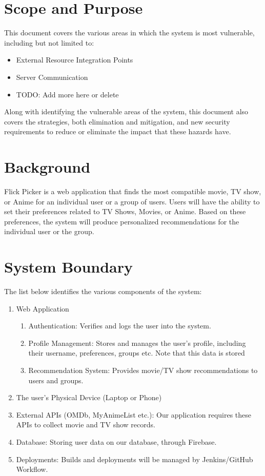 \documentclass[12pt]{article}
\begin{document}
\section{Scope and Purpose}
This document covers the various areas in which the system is most vulnerable, including but not limited to:
\begin{itemize}
	\item External Resource Integration Points
	\item Server Communication
	\item TODO: Add more here or delete
\end{itemize}
Along with identifying the vulnerable areas of the system, this document also covers the strategies, both elimination and mitigation, and new security requirements to reduce or eliminate the impact that these hazards have.

\section{Background}
Flick Picker is a web application that finds the most compatible movie, TV show, or Anime for an individual user or a group of users. Users will have the ability to set their preferences related to TV Shows, Movies, or Anime. Based on these preferences, the system will produce personalized recommendations for the individual user or the group.

\section{System Boundary}
The list below identifies the various components of the system:
\begin{enumerate}
	\item Web Application
	\begin{enumerate}
	  \item Authentication: Verifies and logs the user into the system.
	  \item Profile Management: Stores and manages the user's profile, including their username, preferences, groups etc. Note that this data is stored
	  \item Recommendation System: Provides movie/TV show recommendations to users and groups.
	\end{enumerate}
	\item The user's Physical Device (Laptop or Phone)
	\item External APIs (OMDb, MyAnimeList etc.): Our application requires these APIs to collect movie and TV show records.
	\item Database: Storing user data on our database, through Firebase.
	\item Deployments: Builds and deployments will be managed by Jenkins/GitHub Workflow.
	
\end{enumerate}
\end{document}
